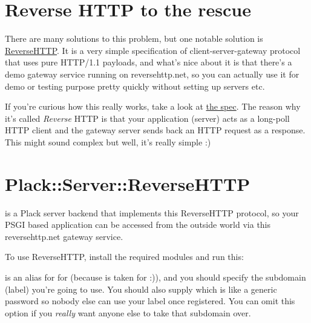\section{Reverse HTTP to the
rescue}\label{reverse-http-to-the-rescue}

There are many solutions to this problem, but one notable solution is
\href{http://www.reversehttp.net/}{ReverseHTTP}. It is a very simple
specification of client-server-gateway protocol that uses pure HTTP/1.1
payloads, and what's nice about it is that there's a demo gateway
service running on reversehttp.net, so you can actually use it for demo
or testing purpose pretty quickly without setting up servers etc.

If you're curious how this really works, take a look at
\href{http://www.reversehttp.net/specs.html}{the spec}. The reason why
it's called \emph{Reverse} HTTP is that your application (server) acts
as a long-poll HTTP client and the gateway server sends back an HTTP
request as a response. This might sound complex but well, it's really
simple :)

\section{Plack::Server::ReverseHTTP}\label{plackserverreversehttp}

\href{http://search.cpan.org/~miyagawa/Plack-Server-ReverseHTTP-0.01/}{}
is a Plack server backend that implements this ReverseHTTP protocol, so
your PSGI based application can be accessed from the outside world via
this reversehttp.net gateway service.

To use ReverseHTTP, install the required modules and run this:


 is an alias for  for  (because
 is taken for  :)), and you should
specify the subdomain (label) you're going to use. You should also
supply  which is like a generic password so nobody
else can use your label once registered. You can omit this option if you
\emph{really} want anyone else to take that subdomain over.

